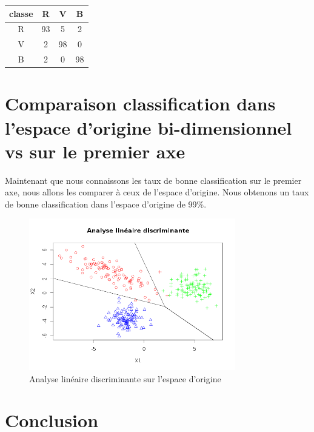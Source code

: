 \documentclass[a4paper,11pt]{article}
\begin{document}
  \begin{center}
  \begin{tabular}{|c|c|c|c|}
   \hline
   classe & R & V & B\\
   \hline
   R & 93 & 5 & 2 \\
   \hline
   V & 2 & 98 & 0 \\
   \hline
   B & 2 & 0 & 98 \\
   \hline
  \end{tabular}
  \end{center}
  
  \section{Comparaison classification dans l'espace d'origine bi-dimensionnel vs sur le premier axe}
  Maintenant que nous connaissons les taux de bonne classification sur le premier axe, nous allons
  les comparer à ceux de l'espace d'origine. Nous obtenons un taux de bonne classification dans l'espace
  d'origine de 99\%.
  
   \begin{figure}[H]
    \center
   \includegraphics[width=9cm]{analyse_lin_test.png}
    \caption{Analyse linéaire discriminante sur l'espace d'origine}
  \end{figure}
  
  
  \section{Conclusion}
  
  \newpage
\end{document}
